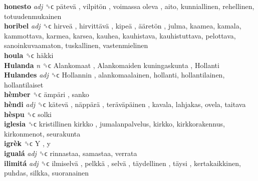 \textbf{honesto} \emph{adj}  ␝ϲ   pätevä ,  vilpitön ,  voimassa oleva , aito, kunniallinen, rehellinen, totuudenmukainen  \\
\textbf{horibel} \emph{adj}  ␝ϲ   hirveä ,  hirvittävä ,  kipeä ,  ääretön , julma, kaamea, kamala, kammottava, karmea, karsea, kauhea, kauhistava, kauhistuttava, pelottava, sanoinkuvaamaton, tuskallinen, vastenmielinen  \\
\textbf{houla} ␝ϲ   häkki   \\
\textbf{Hulanda} \emph{n}  ␝ϲ   Alankomaat ,  Alankomaiden kuningaskunta ,  Hollanti   \\
\textbf{Hulandes} \emph{adj}  ␝ϲ   Hollannin , alankomaalainen, hollanti, hollantilainen, hollantilaiset  \\
\textbf{hèmber} ␝ϲ   ämpäri , sanko  \\
\textbf{hèndi} \emph{adj}  ␝ϲ   kätevä ,  näppärä ,  teräväpäinen , kavala, lahjakas, ovela, taitava  \\
\textbf{hèspu} ␝ϲ  solki  \\
\textbf{iglesia} ␝ϲ   kristillinen kirkko , jumalanpalvelus, kirkko, kirkkorakennus, kirkonmenot, seurakunta  \\
\textbf{igrèk} ␝ϲ   Y , y  \\
\textbf{igualá} \emph{adj}  ␝ϲ  rinnastaa, samastaa, verrata  \\
\textbf{ilimitá} \emph{adj}  ␝ϲ   ilmiselvä ,  pelkkä ,  selvä ,  täydellinen ,  täysi , kertakaikkinen, puhdas, silkka, suoranainen  \\
